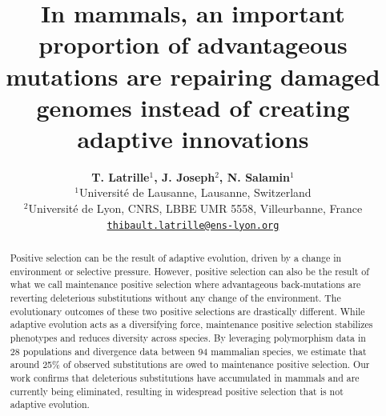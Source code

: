 \documentclass{article}
\title{In mammals, an important proportion of advantageous mutations are repairing damaged genomes instead of creating adaptive innovations}
\author{
    \large
    \textbf{T. {Latrille}$^{1}$, J. {Joseph}$^{2}$, N. {Salamin}$^{1}$}\\
    \normalsize
    $^{1}$Université de Lausanne, Lausanne, Switzerland\\
    $^{2}$Université de Lyon, CNRS, LBBE UMR 5558, Villeurbanne, France \\
    \texttt{\href{mailto:thibault.latrille@ens-lyon.org}{thibault.latrille@ens-lyon.org}} \\
}
\begin{document}
    \maketitle

    \begin{abstract}
        Positive selection can be the result of adaptive evolution, driven by a change in environment or selective pressure.
        However, positive selection can also be the result of what we call maintenance positive selection where advantageous back-mutations are reverting deleterious substitutions without any change of the environment.
        The evolutionary outcomes of these two positive selections are drastically different.
        While adaptive evolution acts as a diversifying force, maintenance positive selection stabilizes phenotypes and reduces diversity across species.
        By leveraging polymorphism data in 28 populations and divergence data between 94 mammalian species, we estimate that around 25\% of observed substitutions are owed to maintenance positive selection.
        Our work confirms that deleterious substitutions have accumulated in mammals and are currently being eliminated, resulting in widespread positive selection that is not adaptive evolution.
    \end{abstract}

\end{document}
